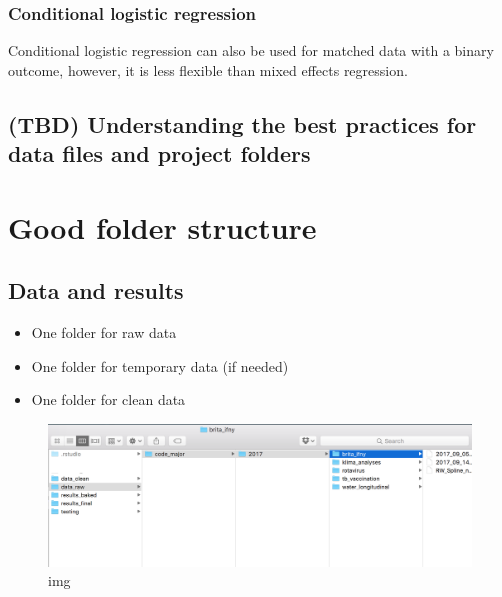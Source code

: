 \documentclass[12pt,]{article}
\providecommand{\tightlist}{%
  \setlength{\itemsep}{0pt}\setlength{\parskip}{0pt}}
\begin{document}
\subsubsection{Conditional logistic
regression}\label{conditional-logistic-regression}

Conditional logistic regression can also be used for matched data with a
binary outcome, however, it is less flexible than mixed effects
regression.

\subsection{(TBD) Understanding the best practices for data files and
project
folders}\label{tbd-understanding-the-best-practices-for-data-files-and-project-folders}

\section{Good folder structure}\label{good-folder-structure}

\subsection{Data and results}\label{data-and-results}

\begin{itemize}
\tightlist
\item
  One folder for raw data
\item
  One folder for temporary data (if needed)
\item
  One folder for clean data
\end{itemize}

\begin{figure}
\centering
\includegraphics{resources/folder_raw.png}
\caption{img}
\end{figure}
\end{document}
